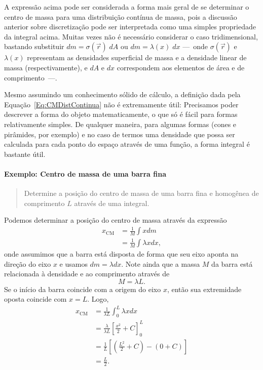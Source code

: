 A expressão acima pode ser considerada a forma mais geral de se determinar o centro de massa para uma distribuição contínua de massa, pois a discussão anterior sobre discretização pode ser interpretada como uma simples propriedade da integral acima. Muitas vezes não é necessário considerar o caso tridimensional, bastando substituir $dm = \sigma(\vec{r}) \; dA$ ou $dm = \lambda(x) \; dx$ ---~onde $\sigma(\vec{r})$ e $\lambda(x)$ representam as densidades superficial de massa e a densidade linear de massa (respectivamente), e $dA$ e $dx$ correspondem aos elementos de área e de comprimento~---.

Mesmo assumindo um conhecimento sólido de cálculo, a definição dada pela Equação~\eqref{Eq:CMDistContinua} não é extremamente útil: Precisamos poder descrever a forma do objeto matematicamente, o que só é fácil para formas relativamente simples. De qualquer maneira, para algumas formas (cones e pirâmides, por exemplo) e no caso de termos uma densidade que possa ser calculada para cada ponto do espaço através de uma função, a forma integral é bastante útil.

\paragraph{Exemplo: Centro de massa de uma barra fina}

\begin{quote}
    Determine a posição do centro de massa de uma barra fina e homogênea de comprimento $L$ através de uma integral.
\end{quote}

Podemos determinar a posição do centro de massa através da expressão
\begin{align}
    x_{\text{CM}} &= \frac{1}{M} \int x dm \\
    &= \frac{1}{M} \int \lambda x dx,
\end{align}
%
onde assumimos que a barra está disposta de forma que seu eixo aponta na direção do eixo $x$ e usamos $dm = \lambda dx$. Note ainda que a massa $M$ da barra está relacionada à densidade e ao comprimento através de
\begin{equation}
    M = \lambda L.
\end{equation}
%
Se o início da barra coincide com a origem do eixo $x$, então sua extremidade oposta coincide com $x = L$. Logo,
\begin{align}
    x_{\text{CM}} &= \frac{1}{\lambda L} \int_0^L \lambda x dx \\
    &= \frac{\lambda}{\lambda L} \left[\frac{x^2}{2} + C\right]_0^L \\
    &= \frac{1}{L} \left[\left(\frac{L^2}{2} + C\right) - (0 + C)\right] \\
    &= \frac{L}{2}.
\end{align}

